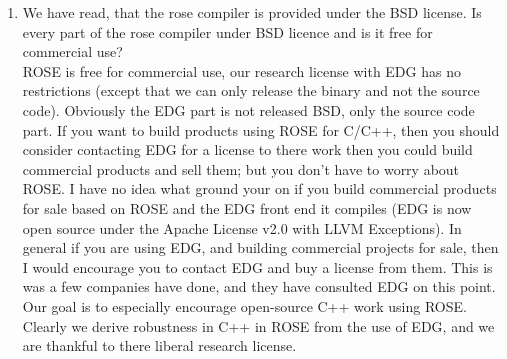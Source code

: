 \begin{enumerate}
The AST Rewrite Mechanism functions to use are the 
{\indent
{\mySmallFontSize
\begin{verbatim}
     LowLevelRewrite::remove ( SgStatement* astNode )
\end{verbatim}
}}
and 
{\indent
{\mySmallFontSize
\begin{verbatim}
     LowLevelRewrite::insert ( SgStatement* targetStatement, SgStatementPtrList newStatementList, bool insertBeforeNode ).
\end{verbatim}
}}

These will automatically disassociate any {\tt cpp} directives and comments
from the surrounding statements and reattach them so that they don't
wander around with the statements being removed, inserted, or replaced.

I will try to get to fixing up the ROSE Tutorial example so use this
interface.  Rich and I have been spending a lot of time on the Tutorial 
lately (after finishing the ROSE User Manual two weeks ago).  We are getting
all the documentation ready for release on the web.  This will likely 
happen in a few weeks, though all the paperwork and approvals are already
in place.

So as it is, this is a wonderful example of just what a bad idea it is
to manipulate the AST at such a low level.
It is the reason we have the AST Rewrite Mechanism -- provide the highest level
of interface required to make manipulation generally more simple.



\item  We have read, that the rose compiler is provided under the BSD license. Is every
    part of the rose compiler under BSD licence and is it free for commercial use? \\
   ROSE is free for commercial use, our research license with EDG has no
restrictions (except that we can only release the binary and not the source code).
Obviously the EDG part is not released BSD, only the source code part.
If you want to build products using ROSE for C/C++, then you should
consider contacting EDG for a license to there work then you could
build commercial products and sell them; but you don't have to worry
about ROSE.  I have no idea what ground your on if you build commercial
products for sale based on ROSE and the EDG front end it compiles
(EDG is now open source under the Apache License v2.0 with LLVM Exceptions).
In general if you are using EDG, and building commercial projects for sale,
then I would encourage you to contact EDG and buy a license from them.
This is was a few companies have done, and they have consulted EDG on this
point.  Our goal is to especially encourage open-source C++ work using ROSE.
Clearly we derive robustness in C++ in ROSE from the use of EDG, and we
are thankful to there liberal research license.


\end{enumerate}
